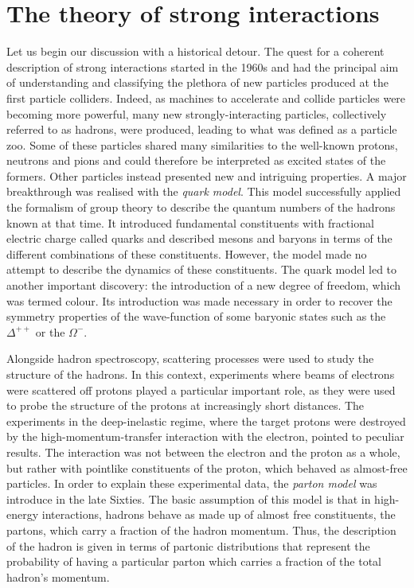 \section{The theory of strong interactions}
Let us begin our discussion with a historical detour. 
%
The quest for a coherent description of strong interactions started in the 1960s and had the principal aim of understanding and classifying the plethora of new
particles produced at the first particle colliders. 
%
Indeed, as machines to accelerate and collide particles were becoming more powerful, many new strongly-interacting particles, collectively referred to as hadrons, were produced, leading to what was defined as a particle zoo. Some of these particles shared many similarities to the well-known protons, neutrons and pions and could therefore be interpreted as excited states of the formers. Other particles instead presented new and intriguing properties. 
%
A major breakthrough was realised with the \emph{quark model}.
%
This model successfully applied the formalism of group theory to describe the quantum numbers of the hadrons known at that time. It introduced fundamental constituents with fractional electric charge called quarks and described mesons and baryons in terms of the different combinations of these constituents. However, the model made no attempt to describe the dynamics of these constituents. 
%
The quark model led to another important discovery: the introduction of a new degree of freedom, which was termed colour. Its introduction was made necessary in order to recover the symmetry properties of the wave-function of some baryonic states such as the $\Delta^{++}$ or the $\Omega^-$.

Alongside hadron spectroscopy, scattering processes were used to study the structure of the hadrons. In this context, experiments where beams of electrons were scattered off protons played a particular important role, as they were used to probe the structure of the protons at increasingly short distances. 
%
The experiments in the deep-inelastic regime, where the target protons were destroyed by the high-momentum-transfer interaction with the electron, pointed to  peculiar results. The interaction was not between the electron and the proton as a whole, but rather with pointlike constituents of the proton, which behaved as almost-free particles. 
%
In order to explain these experimental data, the \emph{parton model} was introduce in the late Sixties.
 The basic assumption of this model is that in high-energy interactions, hadrons behave as made up of almost free constituents, the partons, which carry a fraction of the hadron momentum.
 Thus, the description of the hadron is given in terms of partonic
distributions that represent the probability of having a particular
parton which carries a fraction of the total hadron's momentum.


